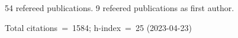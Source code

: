 54 refereed publications. 9 refeered publications as first author.

Total citations~=~1584; h-index~=~25 (2023-04-23)